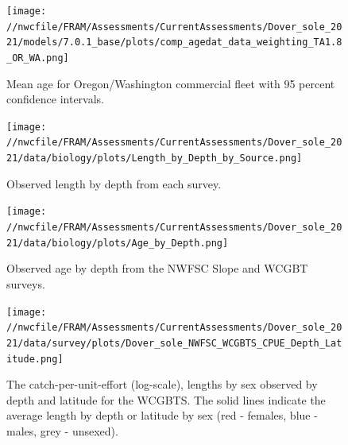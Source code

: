 \documentclass[11pt,
  english,
  a4paper,
]{article}
\begin{document}
\begin{figure}
\centering
\texttt{[image: //nwcfile/FRAM/Assessments/CurrentAssessments/Dover\_sole\_2021/models/7.0.1\_base/plots/comp\_agedat\_data\_weighting\_TA1.8\_OR\_WA.png]}
\caption{Mean age for Oregon/Washington commercial fleet with 95 percent confidence intervals.\label{fig:mean-orwa-age-data}}
\end{figure}

\tagmcend\tagstructend


\begin{figure}
\centering
\texttt{[image: //nwcfile/FRAM/Assessments/CurrentAssessments/Dover\_sole\_2021/data/biology/plots/Length\_by\_Depth\_by\_Source.png]}
\caption{Observed length by depth from each survey.\label{fig:data-len-depth}}
\end{figure}

\tagmcend\tagstructend

\newpage


\begin{figure}
\centering
\texttt{[image: //nwcfile/FRAM/Assessments/CurrentAssessments/Dover\_sole\_2021/data/biology/plots/Age\_by\_Depth.png]}
\caption{Observed age by depth from the NWFSC Slope and WCGBT surveys.\label{fig:data-age-depth}}
\end{figure}

\tagmcend\tagstructend

\newpage


\begin{figure}
\centering
\texttt{[image: //nwcfile/FRAM/Assessments/CurrentAssessments/Dover\_sole\_2021/data/survey/plots/Dover\_sole\_NWFSC\_WCGBTS\_CPUE\_Depth\_Latitude.png]}
\caption{The catch-per-unit-effort (log-scale), lengths by sex observed by depth and latitude for the WCGBTS. The solid lines indicate the average length by depth or latitude by sex (red - females, blue - males, grey - unsexed).\label{fig:cpue-len}}
\end{figure}
\end{document}
